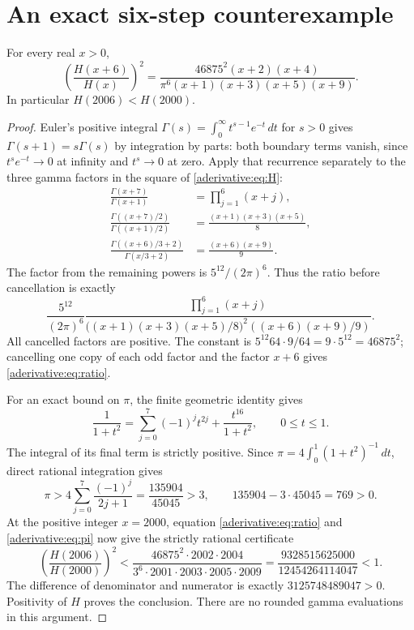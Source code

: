 \documentclass[11pt]{article}
\begin{document}
\section{An exact six-step counterexample}\label{aderivative:sec:counterexample}
\begin{aderivativetheorem}\label{aderivative:thm:ratio}
For every real $x>0$,
\begin{equation}\label{aderivative:eq:ratio}
\left(\frac{H(x+6)}{H(x)}\right)^2
=\frac{46875^2(x+2)(x+4)}
{\pi^6(x+1)(x+3)(x+5)(x+9)}.
\end{equation}
In particular $H(2006)<H(2000)$.
\end{aderivativetheorem}
\begin{proof}
Euler's positive integral
$\Gamma(s)=\int_0^\infty t^{s-1}e^{-t}\,dt$ for $s>0$
gives $\Gamma(s+1)=s\Gamma(s)$ by integration by parts: both
boundary terms vanish, since $t^se^{-t}\to0$ at infinity and
$t^s\to0$ at zero. Apply that recurrence separately to the
three gamma factors in the square of \eqref{aderivative:eq:H}:
\begin{align}
\frac{\Gamma(x+7)}{\Gamma(x+1)}
&=\prod_{j=1}^6(x+j),\label{aderivative:eq:factorialratio}\\
\frac{\Gamma((x+7)/2)}{\Gamma((x+1)/2)}
&=\frac{(x+1)(x+3)(x+5)}8,\label{aderivative:eq:halfratio}\\
\frac{\Gamma((x+6)/3+2)}{\Gamma(x/3+2)}
&=\frac{(x+6)(x+9)}9.\label{aderivative:eq:thirdratio}
\end{align}
The factor from the remaining powers is $5^{12}/(2\pi)^6$.
Thus the ratio before cancellation is exactly
\[
\frac{5^{12}}{(2\pi)^6}
\frac{\prod_{j=1}^6(x+j)}
{\bigl((x+1)(x+3)(x+5)/8\bigr)^2
 ((x+6)(x+9)/9)}.
\]
All cancelled factors are positive. The constant is
$5^{12}64\cdot9/64=9\cdot5^{12}=46875^2$;
cancelling one copy of each odd factor and the factor $x+6$
gives \eqref{aderivative:eq:ratio}.

For an exact bound on $\pi$, the finite geometric identity gives
\[
\frac1{1+t^2}=\sum_{j=0}^7(-1)^jt^{2j}
+\frac{t^{16}}{1+t^2},\qquad 0\le t\le1.
\]
The integral of its final term is strictly positive. Since
$\pi=4\int_0^1(1+t^2)^{-1}\,dt$, direct rational integration gives
\begin{equation}\label{aderivative:eq:pi}
\pi>4\sum_{j=0}^7\frac{(-1)^j}{2j+1}
=\frac{135904}{45045}>3,
\qquad 135904-3\cdot45045=769>0.
\end{equation}
At the positive integer $x=2000$, equation \eqref{aderivative:eq:ratio} and
\eqref{aderivative:eq:pi} now give the strictly rational certificate
\begin{equation}\label{aderivative:eq:certificate}
\left(\frac{H(2006)}{H(2000)}\right)^2
<\frac{46875^2\cdot2002\cdot2004}
{3^6\cdot2001\cdot2003\cdot2005\cdot2009}
=\frac{9328515625000}{12454264114047}<1.
\end{equation}
The difference of denominator and numerator is exactly
$3125748489047>0$. Positivity of $H$ proves the conclusion.
There are no rounded gamma evaluations in this argument.
\end{proof}
\end{document}
